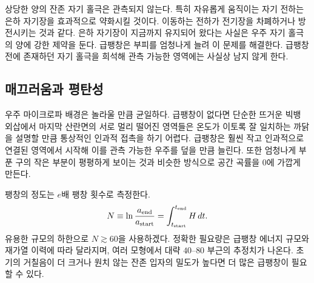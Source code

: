 상당한 양의 잔존 자기 홀극은 관측되지 않는다. 특히 자유롭게 움직이는 자기 전하는 은하 자기장을 효과적으로 약화시킬 것이다. 이동하는 전하가 전기장을 차폐하거나 방전시키는 것과 같다. 은하 자기장이 지금까지 유지되어 왔다는 사실은 우주 자기 홀극의 양에 강한 제약을 둔다. 급팽창은 부피를 엄청나게 늘려 이 문제를 해결한다. 급팽창 전에 존재하던 자기 홀극을 희석해 관측 가능한 영역에는 사실상 남지 않게 한다.

\subsection{매끄러움과 평탄성}

우주 마이크로파 배경은 놀라울 만큼 균일하다. 급팽창이 없다면 단순한 뜨거운 빅뱅 외삽에서 마지막 산란면의 서로 멀리 떨어진 영역들은 온도가 이토록 잘 일치하는 까닭을 설명할 만큼 통상적인 인과적 접촉을 하기 어렵다. 급팽창은 훨씬 작고 인과적으로 연결된 영역에서 시작해 이를 관측 가능한 우주를 덮을 만큼 늘린다. 또한 엄청나게 부푼 구의 작은 부분이 평평하게 보이는 것과 비슷한 방식으로 공간 곡률을 0에 가깝게 만든다.

팽창의 정도는 \(e\)배 팽창 횟수로 측정한다.
\begin{equation}
N\equiv \ln\frac{a_{\rm end}}{a_{\rm start}}
=\int_{t_{\rm start}}^{t_{\rm end}}H\,dt.
\label{eq:c09-efolds}
\end{equation}
유용한 규모의 하한으로 \(N\gtrsim60\)을 사용하겠다. 정확한 필요량은 급팽창 에너지 규모와 재가열 이력에 따라 달라지며, 여러 모형에서 대략 \(40\)--\(80\) 부근의 추정치가 나온다. 초기의 거칠음이 더 크거나 원치 않는 잔존 입자의 밀도가 높다면 더 많은 급팽창이 필요할 수 있다.

\begin{classroomqa}
\end{classroomqa}

\begin{classroomqa}
\end{classroomqa}


